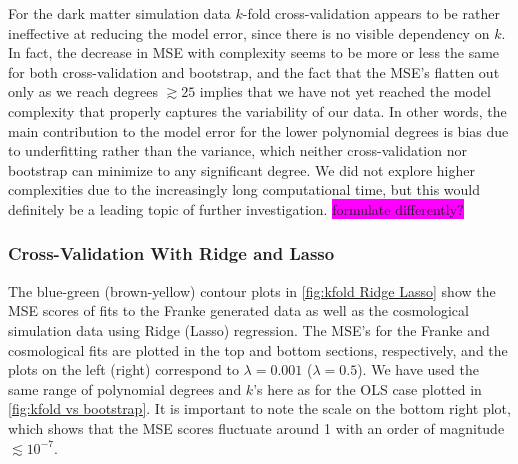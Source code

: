 \documentclass[aps,pra,english,notitlepage,reprint,nofootinbib]{revtex4-1}  %
\begin{document}
For the dark matter simulation data $k$-fold cross-validation appears to be rather ineffective at reducing the model error, since there is no visible dependency on $k$. In fact, the decrease in MSE with complexity seems to be more or less the same for both cross-validation and bootstrap, and the fact that the MSE's flatten out only as we reach degrees $\gtrsim25$ implies that we have not yet reached the model complexity that properly captures the variability of our data. In other words, the main contribution to the model error for the lower polynomial degrees is bias due to underfitting rather than the variance, which neither cross-validation nor bootstrap can minimize to any significant degree. We did not explore higher complexities due to the increasingly long computational time, but this would definitely be a leading topic of further investigation. \colorbox{magenta}{formulate differently?}


\subsubsection{Cross-Validation With Ridge and Lasso}
The blue-green (brown-yellow) contour plots in \cref{fig:kfold Ridge Lasso} show the MSE scores of fits to the Franke generated data as well as the cosmological simulation data using Ridge (Lasso) regression. The MSE's for the Franke and cosmological fits are plotted in the top and bottom sections, respectively, and the plots on the left (right) correspond to $\lambda=0.001$ ($\lambda=0.5$). We have used the same range of polynomial degrees and $k$'s here as for the OLS case plotted in \cref{fig:kfold vs bootstrap}. It is important to note the scale on the bottom right plot, which shows that the MSE scores fluctuate around 1 with an order of magnitude $\lesssim10^{-7}$. 
\end{document}
